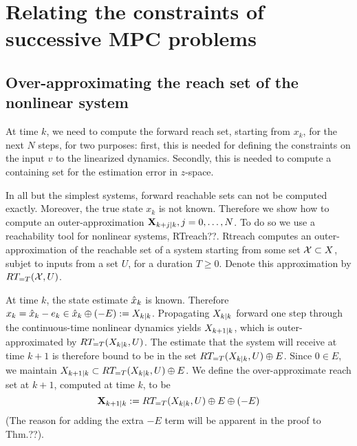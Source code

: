 \section{Relating the constraints of successive MPC problems}
\label{sec:set inclusions}

\newcommand{\RT}[1]{RT_{=T}(#1,U)}


 \subsection{Over-approximating the reach set of the nonlinear system}
\label{sec:x reach}

At time $k$, we need to compute the forward reach set, starting from $x_k$, for the next $N$ steps, for two purposes:
first, this is needed for defining the constraints on the input $v$ to the linearized dynamics.
Secondly, this is needed to compute a containing set for the estimation error in $z$-space.

In all but the simplest systems, forward reachable sets can not be computed exactly.
Moreover, the true state $x_k$ is not known.
Therefore we show how to compute an outer-approximation $\mathbf{X}_{k+j|k},  j=0,\ldots, N$.
To do so we use a reachability tool for nonlinear systems, RTreach??. 
Rtreach computes an outer-approximation of the reachable set of a system starting from some set $\mathcal{X} \subset X$, subjet to inputs from a set $U$, for a duration $T \geq 0$. 
Denote this approximation by $\RT{\Xc}$.

At time $k$, the state estimate $\hat{x}_{k}$ is known.
Therefore $x_k = \hat{x}_{k} - e_k \in \hat{x}_{k} \oplus (-E) := X_{k|k}$.
Propagating $X_{k|k}$ forward one step through the continuous-time nonlinear dynamics yields $X_{k+1|k}$, which is outer-approximated by $\RT{\Xset{k}{k}}$.
The estimate that the system will receive at time $k+1$ is therefore bound to be in the set $\RT{\Xset{k}{k}}  \oplus E$.
Since $0 \in E$, we maintain $\Xset{k+1}{k} \subset \RT{\Xset{k}{k}}  \oplus E$.
We define the over-approximate reach set at $k+1$, computed at time $k$, to be 
\begin{equation*}
\label{eq:def Xk}
\oaXset{k+1}{k} \defeq  \RT{\Xset{k}{k}}  \oplus E \oplus  (-E)
\end{equation*}
(The reason for adding the extra $-E$ term will be apparent in the proof to Thm.??).

